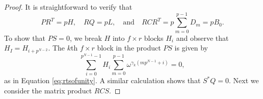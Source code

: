 \documentclass[preprint,12pt]{elsarticle}
\theoremstyle{definition}
\theoremstyle{remark}
\begin{document}
\begin{proof}
It is straightforward to verify that 
\[
PR^T=pH, \quad RQ=pL, \quad \text{and} \quad RCR^T=p\sum_{m=0}^{p-1}{D_m}=pB_0.
\]
To show that $PS = 0$, we break $H$ into $f \times r$ blocks $H_i$ and observe that $H_I = H_{i + p^{N-2}}$. The $k$th $f \times r$ block in the product $PS$ is given by 
\[ \sum_{i=0}^{p^{N-1}-1}H_i\sum_{m=0}^{p-1}\omega^{\gamma_k (mp^{N-1}+i)} =0,
\]
as in Equation \ref{eq:rtsofunity}. A similar calculation shows that $S^*Q=0$. Next we consider the matrix product $RCS$.

\end{proof}
\end{document}
